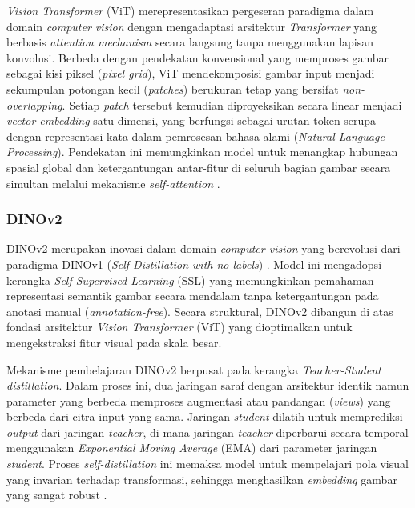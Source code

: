 \textit{Vision Transformer} (ViT) merepresentasikan pergeseran paradigma dalam domain \textit{computer vision} dengan mengadaptasi arsitektur \textit{Transformer} yang berbasis \textit{attention mechanism} secara langsung tanpa menggunakan lapisan konvolusi. Berbeda dengan pendekatan konvensional yang memproses gambar sebagai kisi piksel (\textit{pixel grid}), ViT mendekomposisi gambar input menjadi sekumpulan potongan kecil (\textit{patches}) berukuran tetap yang bersifat \textit{non-overlapping}. Setiap \textit{patch} tersebut kemudian diproyeksikan secara linear menjadi \textit{vector embedding} satu dimensi, yang berfungsi sebagai urutan token serupa dengan representasi kata dalam pemrosesan bahasa alami (\textit{Natural Language Processing}). Pendekatan ini memungkinkan model untuk menangkap hubungan spasial global dan ketergantungan antar-fitur di seluruh bagian gambar secara simultan melalui mekanisme \textit{self-attention} \citep{dosovitskiyImageWorth16x162021}.

\subsubsection{DINOv2}

DINOv2 merupakan inovasi dalam domain \textit{computer vision} yang berevolusi dari paradigma DINOv1 (\textit{Self-Distillation with no labels}) \citep{caron2021emergingpropertiesselfsupervisedvision}. Model ini mengadopsi kerangka \textit{Self-Supervised Learning} (SSL) yang memungkinkan pemahaman representasi semantik gambar secara mendalam tanpa ketergantungan pada anotasi manual (\textit{annotation-free}). Secara struktural, DINOv2 dibangun di atas fondasi arsitektur \textit{Vision Transformer} (ViT) yang dioptimalkan untuk mengekstraksi fitur visual pada skala besar.

Mekanisme pembelajaran DINOv2 berpusat pada kerangka \textit{Teacher-Student distillation}. Dalam proses ini, dua jaringan saraf dengan arsitektur identik namun parameter yang berbeda memproses augmentasi atau pandangan (\textit{views}) yang berbeda dari citra input yang sama. Jaringan \textit{student} dilatih untuk memprediksi \textit{output} dari jaringan \textit{teacher}, di mana jaringan \textit{teacher} diperbarui secara temporal menggunakan \textit{Exponential Moving Average} (EMA) dari parameter jaringan \textit{student}. Proses \textit{self-distillation} ini memaksa model untuk mempelajari pola visual yang invarian terhadap transformasi, sehingga menghasilkan \textit{embedding} gambar yang sangat robust \citep{oquabDINOv2LearningRobust2024}.

